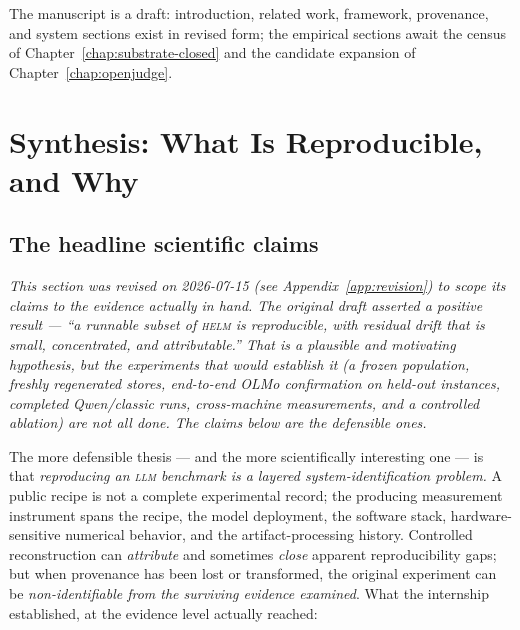 \documentclass[11pt]{report}
\begin{document}
\noindent The manuscript is a draft: introduction, related work, framework,
provenance, and system sections exist in revised form; the empirical sections await
the census of Chapter~\ref{chap:substrate-closed} and the candidate expansion of
Chapter~\ref{chap:openjudge}.

\chapter{Synthesis: What Is Reproducible, and Why}
\label{chap:synthesis}

\section{The headline scientific claims}

\emph{This section was revised on 2026-07-15 (see Appendix~\ref{app:revision}) to
scope its claims to the evidence actually in hand. The original draft asserted a
positive result --- ``a runnable subset of \textsc{helm} \emph{is} reproducible,
with residual drift that is small, concentrated, and attributable.'' That is a
plausible and motivating \emph{hypothesis}, but the experiments that would
establish it (a frozen population, freshly regenerated stores, end-to-end OLMo
confirmation on held-out instances, completed Qwen/classic runs, cross-machine
measurements, and a controlled ablation) are not all done. The claims below are the
defensible ones.}

\medskip
The more defensible thesis --- and the more scientifically interesting one --- is
that \emph{reproducing an \textsc{llm} benchmark is a layered system-identification
problem.} A public recipe is not a complete experimental record; the producing
measurement instrument spans the recipe, the model deployment, the software stack,
hardware-sensitive numerical behavior, and the artifact-processing history.
Controlled reconstruction can \emph{attribute} and sometimes \emph{close} apparent
reproducibility gaps; but when provenance has been lost or transformed, the original
experiment can be \emph{non-identifiable from the surviving evidence examined}. What the internship established, at the
evidence level actually reached:
\end{document}
